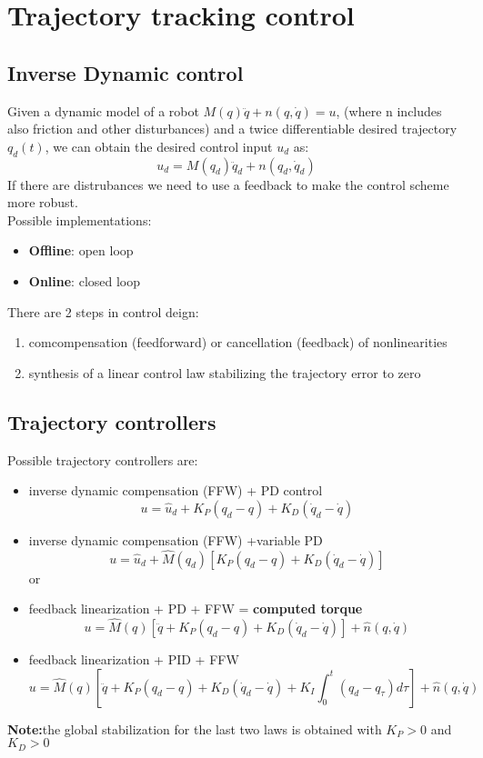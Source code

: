 \documentclass[a4paper,12pt]{article}
\begin{document}
\section{Trajectory tracking control}
\subsection{Inverse Dynamic control}
Given a dynamic model of a robot $M(q)\ddot{q} + n(q,\dot{q}) = u$,
(where n includes also friction and other disturbances) and a 
twice differentiable desired trajectory $q_d(t)$, we can obtain the desired 
control input $u_d$ as: \begin{equation}
    u_d = M(q_d)\ddot{q}_d + n(q_d,\dot{q}_d)
\end{equation}
If there are distrubances we need to use a feedback 
to make the control scheme more robust.\\
Possible implementations: 
\begin{itemize}
    \item \textbf{Offline}: open loop
    \item \textbf{Online}: closed loop
\end{itemize}
There are 2 steps in control deign:
\begin{enumerate}
    \item comcompensation (feedforward) or 
    cancellation (feedback) of nonlinearities
    \item synthesis of a linear control law stabilizing
    the trajectory error to zero
\end{enumerate}
\subsection{Trajectory controllers}
Possible trajectory controllers are:
\begin{itemize}
    \item inverse dynamic compensation (FFW) + PD control 
    \begin{equation}
    u = \hat{u}_d+ K_P(q_d-q)+K_D(\dot{q}_d-\dot{q})    \end{equation}

    \item inverse dynamic compensation (FFW) +variable PD
    \begin{equation}
    u = \hat{u}_d+ \hat{M}(q_d)[K_P(q_d-q)+K_D(\dot{q}_d-\dot{q})]    \end{equation}
   or
    \item feedback linearization + PD + FFW = \textbf{computed torque}
    \begin{equation}
    u = \hat{M}(q)[\ddot{q}+K_P(q_d-q)+K_D(\dot{q}_d-\dot{q})] + \hat{n}(q,\dot{q})   \end{equation}
    \item feedback linearization + PID + FFW
    \begin{equation}
    u = \hat{M}(q)[\ddot{q}+K_P(q_d-q)+K_D(\dot{q}_d-\dot{q})+K_I\int_0^t(q_d-q_\tau)d\tau] + \hat{n}(q,\dot{q})   \end{equation}
\end{itemize}
\textbf{Note:}the global stabilization for the last two laws is obtained with
$K_P > 0$ and $K_D > 0 $
\end{document}
